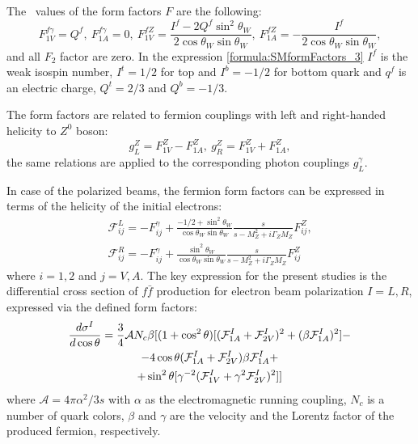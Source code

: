 The \sm\ values of the form factors $F$ are the following:
\begin{equation}
F^{f\gamma}_{1V} = Q^{f}, \ F^{f\gamma}_{1A} = 0, \ F^{fZ}_{1V} = \frac{I^f - 2Q^f\sin^2\theta_W}{2\cos\theta_W\sin\theta_W}, \ F^{fZ}_{1A} = - \frac{I^f}{2\cos\theta_W\sin\theta_W},
\label{formula:SMformFactors_3}
\end{equation}
and all $F_2$ factor are zero. In the expression \ref{formula:SMformFactors_3} $I^f$ is the weak isospin number, $I^t = 1/2$ for top and $I^b = -1/2$ for bottom quark and $q^f$ is an electric charge, $Q^t = 2/3$ and $Q^b = -1/3$.

The form factors are related to fermion couplings with left and right-handed helicity to $Z^0$ boson:
\begin{equation}
g_L^Z = F_{1V}^Z - F_{1A}^Z, \  g_R^Z = F_{1V}^Z + F_{1A}^Z, 
\label{formula:EWcouplings_3}
\end{equation}
the same relations are applied to the corresponding photon couplings $g^\gamma_L$.

In case of the polarized beams, the fermion form factors can be expressed in terms of the helicity of the initial electrons:
\begin{eqnarray}
\mathcal{F}^L_{ij} = - F^\gamma_{ij} +  \frac{-1/2 + \sin^2\theta_W}{\cos\theta_W\sin\theta_W}\frac{s}{s-M^2_Z+i\Gamma_ZM_Z}F^Z_{ij},\\
\mathcal{F}^R_{ij} = - F^\gamma_{ij} +  \frac{\sin^2\theta_W}{\cos\theta_W\sin\theta_W}\frac{s}{s-M^2_Z+i\Gamma_ZM_Z}F^Z_{ij}    
\end{eqnarray}
where $i=1,2$ and $j=V,A$.
The key expression for the present studies is the differential cross section of $f\bar{f}$ production for electron beam polarization $I=L,R$, expressed via the defined form factors:
\begin{multline}
\label{formula:DiffSigma_3}
\frac{d\sigma^I}{d\cos\theta} = \frac{3}{4} \mathcal{A} N_c \beta[ (1+\cos^2\theta) [(\mathcal{F}^I_{1A}+\mathcal{F}^I_{2V})^2+(\beta \mathcal{F}^I_{1A})^2] - \\-4 \cos\theta (\mathcal{F}^I_{1A}+\mathcal{F}^I_{2V})\beta \mathcal{F}^I_{1A} +\\+ \sin^2\theta [\gamma ^{-2} (\mathcal{F}^I_{1V} +\gamma^2 \mathcal{F}^I_{2V})^2] ]
\end{multline}
where $\mathcal{A} = 4\pi\alpha^2/3s$ with $\alpha$ as the electromagnetic running coupling, $N_c$ is a number of quark colors, $\beta$ and $\gamma$ are the velocity and the Lorentz factor of the produced fermion, respectively. 

